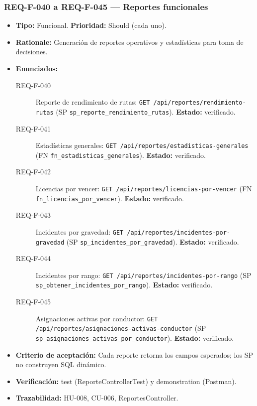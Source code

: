 \documentclass[12pt,a4paper]{article}
\begin{document}
\subsubsection{REQ-F-040 a REQ-F-045 --- Reportes funcionales}
\begin{itemize}
  \item \textbf{Tipo:} Funcional. \textbf{Prioridad:} Should (cada uno).
  \item \textbf{Rationale:} Generación de reportes operativos y estadísticas para toma de decisiones.
  \item \textbf{Enunciados:}
    \begin{description}
      \item[REQ-F-040] Reporte de rendimiento de rutas: \texttt{GET /api/reportes/rendimiento-rutas} (SP \texttt{sp\_reporte\_rendimiento\_rutas}). \textbf{Estado:} verificado.
      \item[REQ-F-041] Estadísticas generales: \texttt{GET /api/reportes/estadisticas-generales} (FN \texttt{fn\_estadisticas\_generales}). \textbf{Estado:} verificado.
      \item[REQ-F-042] Licencias por vencer: \texttt{GET /api/reportes/licencias-por-vencer} (FN \texttt{fn\_licencias\_por\_vencer}). \textbf{Estado:} verificado.
      \item[REQ-F-043] Incidentes por gravedad: \texttt{GET /api/reportes/incidentes-por-gravedad} (SP \texttt{sp\_incidentes\_por\_gravedad}). \textbf{Estado:} verificado.
      \item[REQ-F-044] Incidentes por rango: \texttt{GET /api/reportes/incidentes-por-rango} (SP \texttt{sp\_obtener\_incidentes\_por\_rango}). \textbf{Estado:} verificado.
      \item[REQ-F-045] Asignaciones activas por conductor: \texttt{GET /api/reportes/asignaciones-activas-conductor} (SP \texttt{sp\_asignaciones\_activas\_por\_conductor}). \textbf{Estado:} verificado.
    \end{description}
  \item \textbf{Criterio de aceptación:} Cada reporte retorna los campos esperados; los SP no construyen SQL dinámico.
  \item \textbf{Verificación:} test (ReporteControllerTest) y demonstration (Postman).
  \item \textbf{Trazabilidad:} HU-008, CU-006, ReportesController.
\end{itemize}

\end{document}
